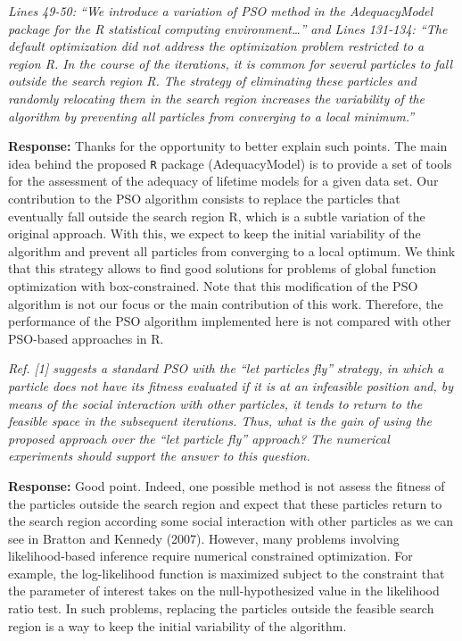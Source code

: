 \documentclass[a4paper,11pt]{exam}
\begin{document}
\begin{questions}

\question  \textit{Lines 49-50: “We introduce a variation of PSO method in the AdequacyModel package for the R statistical computing environment…” and Lines 131-134: “The default optimization did not address the optimization problem restricted to a region R. In the course of the iterations, it is common for several particles to fall outside the search region R. The strategy of eliminating these particles and randomly relocating them in the search region increases the variability of the algorithm by preventing all particles from converging to a local minimum.”}

\noindent \textbf{Response:} Thanks for the opportunity to better explain such points. The main idea behind the proposed \texttt{R} package (AdequacyModel) is to provide a set of tools for the assessment of the adequacy of lifetime models for a given data set. Our contribution to the PSO algorithm consists to replace the particles that eventually fall outside the search region R, which is a subtle variation of the original approach. With this, we expect to keep the initial variability of the algorithm and prevent all particles from converging to a local optimum. We think that this strategy allows to find good solutions for problems of global function optimization with box-constrained. Note that this modification of the PSO algorithm is not our focus or the main contribution of this work. Therefore, the performance of the PSO algorithm implemented here is not compared with other PSO-based approaches in \textsc{R}.  


\question \textit{Ref. [1] suggests a standard PSO with the “let particles fly” strategy, in which a particle does not have its fitness evaluated if it is at an infeasible position and, by means of the social interaction with other particles, it tends to return to the feasible space in the subsequent iterations. Thus, what is the gain of using the proposed approach over the “let particle fly” approach? The numerical experiments should support the answer to this question.}

\noindent \textbf{Response:} Good point. Indeed, one possible method is not assess the fitness of the particles outside the search region and expect that these particles return to the search region according some social interaction with other particles as we can see in Bratton and Kennedy (2007). However, many problems involving likelihood-based inference require numerical constrained optimization. For example, the log-likelihood function is maximized subject to the constraint that the parameter of interest takes on the null-hypothesized value in the likelihood ratio test. In such problems, replacing the particles outside the feasible search region is a way to keep the initial variability of the algorithm. 
\\ 


\end{questions}
\end{document}
